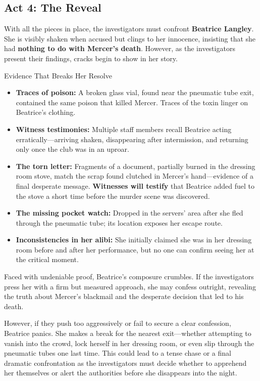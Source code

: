 
\newcolumn
\subsection{Act 4: The Reveal}  

With all the pieces in place, the investigators must confront \textbf{Beatrice Langley}. She is visibly shaken when accused but clings to her innocence, insisting that she had \textbf{nothing to do with Mercer’s death}. However, as the investigators present their findings, cracks begin to show in her story.  

\begin{CommentBox}{Evidence That Breaks Her Resolve}  
	\begin{itemize}  
		\item \textbf{Traces of poison:} A broken glass vial, found near the pneumatic tube exit, contained the same poison that killed Mercer. Traces of the toxin linger on Beatrice’s clothing.  
		\item \textbf{Witness testimonies:} Multiple staff members recall Beatrice acting erratically—arriving shaken, disappearing after intermission, and returning only once the club was in an uproar.  
		\item \textbf{The torn letter:} Fragments of a document, partially burned in the dressing room stove, match the scrap found clutched in Mercer’s hand—evidence of a final desperate message. \textbf{Witnesses will testify} that Beatrice added fuel to the stove a short time before the murder scene was discovered.
		\item \textbf{The missing pocket watch:} Dropped in the servers’ area after she fled through the pneumatic tube; its location exposes her escape route.  
		\item \textbf{Inconsistencies in her alibi:} She initially claimed she was in her dressing room before and after her performance, but no one can confirm seeing her at the critical moment.  
	\end{itemize}  
\end{CommentBox}  

\noindent  
Faced with undeniable proof, Beatrice’s composure crumbles. If the investigators press her with a firm but measured approach, she may confess outright, revealing the truth about Mercer’s blackmail and the desperate decision that led to his death.  

However, if they push too aggressively or fail to secure a clear confession, Beatrice panics. She makes a break for the nearest exit—whether attempting to vanish into the crowd, lock herself in her dressing room, or even slip through the pneumatic tubes one last time. This could lead to a tense chase or a final dramatic confrontation as the investigators must decide whether to apprehend her themselves or alert the authorities before she disappears into the night.  

